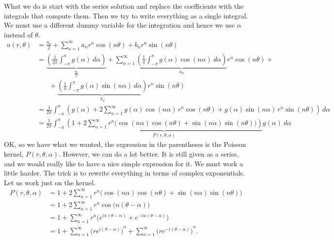 \documentclass{ximera}
\begin{document}
What we do is start with the series solution and replace the coefficients with the integrals that compute them.  Then we try to write everything as a single integral.  We must use a different dummy variable for the integration and hence we use $\alpha$ instead of $\theta$.
\begin{equation*}
    \begin{split}
        u(r,\theta) 
        & = \frac{a_0}{2} + \sum_{n=1}^\infty a_n r^n \cos(n \theta) + b_n r^n \sin(n \theta)\\
        & =\underbrace{ \left( \frac{1}{2\pi} \int_{-\pi}^\pi g(\alpha) ~ d\alpha \right) }_{\frac{a_0}{2}} +
        \sum_{n=1}^\infty \underbrace{ \left( \frac{1}{\pi} \int_{-\pi}^\pi g(\alpha) \cos (n\alpha) ~ d\alpha \right) }_{a_n} r^n \cos(n \theta) + \\
        & ~~~~~~~~ + \underbrace{ \left( \frac{1}{\pi} \int_{-\pi}^\pi g(\alpha) \sin (n\alpha) ~ d\alpha \right) }_{b_n} r^n \sin(n \theta) \\
        & = \frac{1}{2\pi} \int_{-\pi}^\pi \left(  g(\alpha) + 2 \sum_{n=1}^\infty g(\alpha) \cos (n\alpha) \, r^n \cos(n \theta) + g(\alpha) \sin (n\alpha) \, r^n \sin(n \theta) \right) ~d\alpha \\
        & = \frac{1}{2\pi} \int_{-\pi}^\pi \underbrace{ \left( 1 + 2 \sum_{n=1}^\infty r^n \bigl(\cos (n\alpha) \cos(n \theta) + \sin (n\alpha) \sin(n \theta) \bigr) \right) }_{P(r,\theta,\alpha)} g(\alpha) ~d\alpha 
    \end{split}
\end{equation*}
OK\@, so we have what we wanted, the expression in the parentheses is the Poisson kernel, $P(r,\theta,\alpha)$.  However, we can do a lot better.  It is still given as a series, and we would really like to have a nice simple expression for it. We must work a little harder.  The trick is to rewrite everything in terms of complex exponentials.  Let us work just on the kernel.
\begin{equation*}
    \begin{split}
        P(r,\theta,\alpha)
        & = 1 + 2 \sum_{n=1}^\infty r^n \bigl( \cos (n\alpha) \cos(n \theta) + \sin (n\alpha) \sin(n \theta) \bigr) \\
        & = 1 + 2 \sum_{n=1}^\infty r^n \cos \bigl(n(\theta-\alpha)\bigr) \\
        & = 1 + \sum_{n=1}^\infty r^n  \bigl( e^{in(\theta-\alpha)} + e^{-in(\theta-\alpha)} \bigr) \\ 
        & = 1 + \sum_{n=1}^\infty {\bigl( re^{i(\theta-\alpha)}\bigr)}^{n} + \sum_{n=1}^\infty {\bigl( re^{-i(\theta-\alpha)}\bigr)}^{n} .
    \end{split}
\end{equation*}
\end{document}
